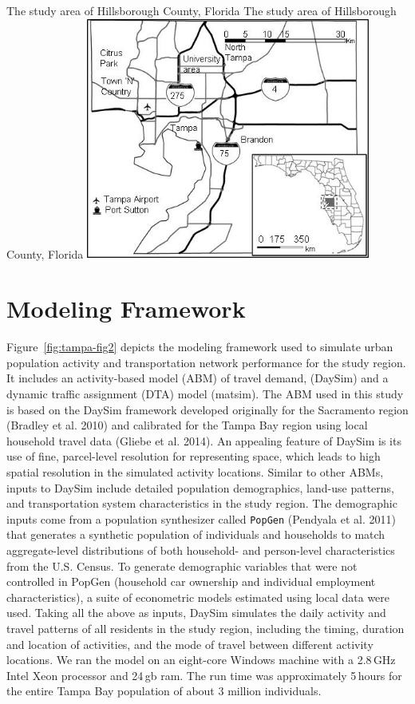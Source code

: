 \createfigure%
{The study area of Hillsborough County, Florida}%
{The study area of Hillsborough County, Florida}%
{\label{fig:tampa-fig1}}%
{\includegraphics[width=0.7\textwidth, angle=0]{./scenarios/figures/tampa-fig1.jpg}}%
{}

\section{Modeling Framework}
Figure~\ref{fig:tampa-fig2} depicts the modeling framework used to simulate urban population activity and transportation network performance for the study region. It includes an activity-based model (ABM)  of travel demand, (DaySim) and a dynamic traffic assignment (DTA)  model (\gls{matsim}). The ABM used in this study is based on the DaySim framework developed originally for the Sacramento region \citep[][]{}(Bradley et al. 2010) and calibrated for the Tampa Bay region using local household travel data \citep[][]{}(Gliebe et al. 2014). An appealing feature of DaySim is its use of fine, parcel-level resolution for representing space, which leads to high spatial resolution in the simulated activity locations.  Similar to other ABMs, inputs to DaySim include detailed population demographics, land-use patterns, and transportation system characteristics in the study region. The demographic inputs come from a population synthesizer called \lstinline|PopGen| \citep[][]{}(Pendyala et al. 2011) that generates a synthetic population of individuals and households to match aggregate-level distributions of both household- and person-level characteristics from the U.S. Census. To generate demographic variables that were not controlled in PopGen (\eg household car ownership and individual employment characteristics), a suite of econometric models estimated using local data were used. Taking all the above as inputs, DaySim simulates the daily activity and travel patterns of all residents in the study region, including the timing, duration and location of activities, and the mode of travel between different activity locations. We ran the model on an eight-core Windows machine with a 2.8\,GHz Intel Xeon processor and 24\,\gls{gb} \gls{ram}. The run time was approximately 5\,hours for the entire Tampa Bay population of about 3 million individuals.

